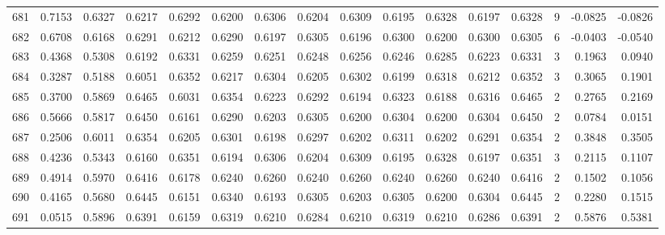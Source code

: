 \begin{tabular}{lrrrrrrrrrrrrrrr}
681 &      0.7153 &  0.6327 &  0.6217 &  0.6292 &  0.6200 &  0.6306 &  0.6204 &  0.6309 &  0.6195 &  0.6328 &   0.6197 &     0.6328 &      9 &                   -0.0825 &                    -0.0826 \\
682 &      0.6708 &  0.6168 &  0.6291 &  0.6212 &  0.6290 &  0.6197 &  0.6305 &  0.6196 &  0.6300 &  0.6200 &   0.6300 &     0.6305 &      6 &                   -0.0403 &                    -0.0540 \\
683 &      0.4368 &  0.5308 &  0.6192 &  0.6331 &  0.6259 &  0.6251 &  0.6248 &  0.6256 &  0.6246 &  0.6285 &   0.6223 &     0.6331 &      3 &                    0.1963 &                     0.0940 \\
684 &      0.3287 &  0.5188 &  0.6051 &  0.6352 &  0.6217 &  0.6304 &  0.6205 &  0.6302 &  0.6199 &  0.6318 &   0.6212 &     0.6352 &      3 &                    0.3065 &                     0.1901 \\
685 &      0.3700 &  0.5869 &  0.6465 &  0.6031 &  0.6354 &  0.6223 &  0.6292 &  0.6194 &  0.6323 &  0.6188 &   0.6316 &     0.6465 &      2 &                    0.2765 &                     0.2169 \\
686 &      0.5666 &  0.5817 &  0.6450 &  0.6161 &  0.6290 &  0.6203 &  0.6305 &  0.6200 &  0.6304 &  0.6200 &   0.6304 &     0.6450 &      2 &                    0.0784 &                     0.0151 \\
687 &      0.2506 &  0.6011 &  0.6354 &  0.6205 &  0.6301 &  0.6198 &  0.6297 &  0.6202 &  0.6311 &  0.6202 &   0.6291 &     0.6354 &      2 &                    0.3848 &                     0.3505 \\
688 &      0.4236 &  0.5343 &  0.6160 &  0.6351 &  0.6194 &  0.6306 &  0.6204 &  0.6309 &  0.6195 &  0.6328 &   0.6197 &     0.6351 &      3 &                    0.2115 &                     0.1107 \\
689 &      0.4914 &  0.5970 &  0.6416 &  0.6178 &  0.6240 &  0.6260 &  0.6240 &  0.6260 &  0.6240 &  0.6260 &   0.6240 &     0.6416 &      2 &                    0.1502 &                     0.1056 \\
690 &      0.4165 &  0.5680 &  0.6445 &  0.6151 &  0.6340 &  0.6193 &  0.6305 &  0.6203 &  0.6305 &  0.6200 &   0.6304 &     0.6445 &      2 &                    0.2280 &                     0.1515 \\
691 &      0.0515 &  0.5896 &  0.6391 &  0.6159 &  0.6319 &  0.6210 &  0.6284 &  0.6210 &  0.6319 &  0.6210 &   0.6286 &     0.6391 &      2 &                    0.5876 &                     0.5381 \\

\end{tabular}
